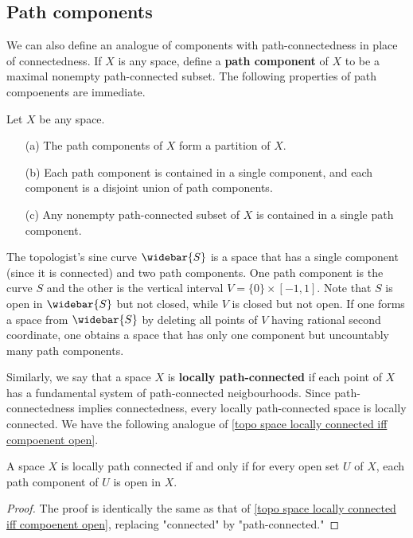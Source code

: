 \subsection{Path components}
We can also define an analogue of components with path-connectedness in place of connectedness. If $X$ is any space, define a \textbf{path component} of $X$ to be a maximal nonempty path-connected subset. The following properties of path compoenents are immediate.
\begin{proposition}
Let $X$ be any space.
\begin{itemize}
\item[(a)] The path components of $X$ form a partition of $X$.
\item[(b)] Each path component is contained in a single component, and each component is a disjoint union of path components.
\item[(c)] Any nonempty path-connected subset of $X$ is contained in a single path component.
\end{itemize}
\end{proposition}
\begin{example}
The topologist's sine curve $\widebar{S}$ is a space that has a single component (since it is connected) and two path components. One path component is the curve $S$ and the other is the vertical interval $V=\{0\}\times[-1,1]$. Note that $S$ is open in $\widebar{S}$ but not closed, while $V$ is closed but not open. If one forms a space from $\widebar{S}$ by deleting all points of $V$ having rational second coordinate, one obtains a space that has only one component but uncountably many path components.
\end{example}
Similarly, we say that a space $X$ is \textbf{locally path-connected} if each point of $X$ has a fundamental system of path-connected neigbourhoods. Since path-connectedness implies connectedness, every locally path-connected space is locally connected. We have the following analogue of \cref{topo space locally connected iff compoenent open}.
\begin{proposition}
A space $X$ is locally path connected if and only if for every open set $U$ of $X$, each path component of $U$ is open in $X$.
\end{proposition}
\begin{proof}
The proof is identically the same as that of \cref{topo space locally connected iff compoenent open}, replacing "connected" by "path-connected."
\end{proof}
